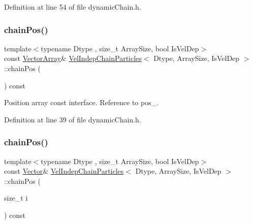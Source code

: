 Definition at line 54 of file dynamic\+Chain.\+h.

\mbox{\label{class_vel_indep_chain_particles_a77765235a45fd13ce74d69d1a1db1770}} 
\subsubsection{\texorpdfstring{chain\+Pos()}{chainPos()}\hspace{0.1cm}{\footnotesize\ttfamily [1/2]}}
{\footnotesize\ttfamily template$<$typename Dtype , size\+\_\+t Array\+Size, bool Is\+Vel\+Dep$>$ \\
const \mbox{\hyperlink{class_vel_indep_particles_a27580f65b6523bfb6900520af2e44708}{Vector\+Array}}\& \mbox{\hyperlink{class_vel_indep_chain_particles}{Vel\+Indep\+Chain\+Particles}}$<$ Dtype, Array\+Size, Is\+Vel\+Dep $>$\+::chain\+Pos (\begin{DoxyParamCaption}{ }\end{DoxyParamCaption}) const\hspace{0.3cm}{\ttfamily [inline]}}



Position array const interface. Reference to pos\+\_\+. 



Definition at line 39 of file dynamic\+Chain.\+h.

\mbox{\label{class_vel_indep_chain_particles_a245e69b858810e26e5ed61746694382e}} 
\subsubsection{\texorpdfstring{chain\+Pos()}{chainPos()}\hspace{0.1cm}{\footnotesize\ttfamily [2/2]}}
{\footnotesize\ttfamily template$<$typename Dtype , size\+\_\+t Array\+Size, bool Is\+Vel\+Dep$>$ \\
const \mbox{\hyperlink{class_vel_indep_particles_aa7e03da81f44941c06abf43ec2180079}{Vector}}\& \mbox{\hyperlink{class_vel_indep_chain_particles}{Vel\+Indep\+Chain\+Particles}}$<$ Dtype, Array\+Size, Is\+Vel\+Dep $>$\+::chain\+Pos (\begin{DoxyParamCaption}\item[{size\+\_\+t}]{i }\end{DoxyParamCaption}) const\hspace{0.3cm}{\ttfamily [inline]}}



